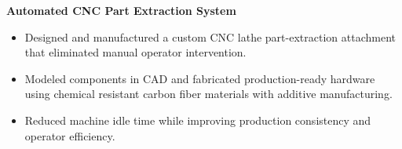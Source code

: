 \documentclass[10pt]{article}
\begin{document}
\vspace{.2em}

\textbf{Automated CNC Part Extraction System}
\begin{itemize}
\item Designed and manufactured a custom CNC lathe part-extraction attachment that eliminated manual operator intervention.
\item Modeled components in CAD and fabricated production-ready hardware using chemical resistant carbon fiber materials with additive manufacturing.
\item Reduced machine idle time while improving production consistency and operator efficiency.
\end{itemize}
\end{document}
